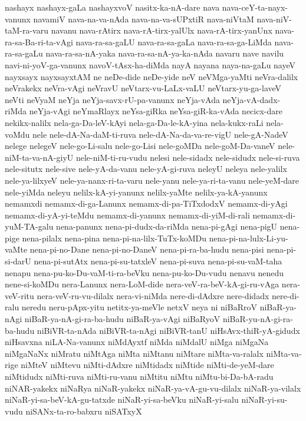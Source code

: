 {nashayx
nashayx-gaLa
nashayxvoV
nasitx-ka-nA-dare
nava
nava-ceY-ta-nayx-vanunx
navamiV
nava-na-va-nAda
nava-na-va-sUPxtiR
nava-niVtaM
nava-niV-taM-ra-varu
navanu
nava-rAtirx
nava-rA-tirx-yalUlx
nava-rA-tirx-yanUnx
nava-ra-sa-Ba-ri-ta-vAgi
nava-ra-sa-gaLU
nava-ra-sa-gaLa
nava-ra-sa-ga-LiMda
nava-ra-sa-gaLu
nava-ra-sa-nA-yaka
nava-ra-sa-nA-ya-ka-nAda
navaru
nave
navilu
navi-ni-yoV-ga-vanunx
navoV-tAsx-ha-diMda
nayA
nayana
naya-na-gaLu
nayeV
nayxsayx
nayxsayxtAM
ne
neDe-dide
neDe-yide
neV
neVMga-yaMti
neVra-dalilx
neVrakekx
neVra-vAgi
neVravU
neVtarx-vu-LaLx-vaLU
neVtarx-yu-ga-laveV
neVti
neVyaM
neYja
neYja-savx-rU-pa-vanunx
neYja-vAda
neYja-vA-dadx-riMda
neYja-vAgi
neYmaRlayx
neYsa-giRka
neYsa-giR-ka-vAda
necicx-dare
nekikx-nalilx
nela-ga-Da-leV-kAyi
nela-ga-Da-le-kA-yina
nela-kukx-raLi
nela-voMdu
nele
nele-dA-Na-daM-ti-ruva
nele-dA-Na-da-va-re-vigU
nele-gA-NadeV
nelege
nelegeV
nele-go-Li-salu
nele-go-Lisi
nele-goMDa
nele-goM-Da-vaneV
nele-niM-ta-va-nA-giyU
nele-niM-ti-ru-vudu
nelesi
nele-sidadx
nele-sidudx
nele-si-ruva
nele-situtx
nele-sive
nele-yA-da-vanu
nele-yA-gi-ruva
neleyU
neleya
nele-yalilx
nele-ya-lilxyeV
nele-ya-nanx-ri-ta-varu
nele-yanu
nele-ya-ri-ta-vanu
nele-yeM-dare
nele-yiMda
neleyu
nelilx-kA-yi-yanunx
nelilx-yaMte
nelilx-ya-kA-yanunx
nemamxdi
nemamx-di-ga-Lanunx
nemamx-di-pa-TiTxdodxV
nemamx-di-yAgi
nemamx-di-yA-yi-teMdu
nemamx-di-yanunx
nemamx-di-yiM-di-rali
nemamx-di-yuM-TA-galu
nena-panunx
nena-pi-dudx-da-riMda
nena-pi-gAgi
nena-pigU
nena-pige
nena-pilalx
nena-pina
nena-pi-na-lilx-TuTx-koMDu
nena-pi-na-lulx-Li-yu-vaMte
nena-pi-no-Dane
nena-pi-no-DaneV
nena-pi-ra-ba-hudu
nena-pisi
nena-pi-si-darU
nena-pi-sutAtx
nena-pi-su-tatxleV
nena-pi-suva
nena-pi-su-vaM-taha
nenapu
nena-pu-ko-Du-vaM-ti-ra-beVku
nena-pu-ko-Du-vudu
nenavu
nenedu
nene-si-koMDu
nera-Lanunx
nera-LoM-dide
nera-veV-ra-beV-kA-gi-ru-vAga
nera-veV-ritu
nera-veV-ru-vu-dilalx
nera-vi-niMda
nere-di-dAdxre
nere-didadx
nere-di-ralu
neredu
neru-pApx-yitu
netitx-ya-meVle
netxV
neya
ni
niBaRroV
niBaR-ya-nAgi
niBaR-ya-nA-gi-ra-ba-hudu
niBaR-ya-vAgi
niBaRyoV
niBaR-yu-nA-gi-ra-ba-hudu
niBiVR-ta-nAda
niBiVR-ta-nAgi
niBiVR-tanU
niHsAvx-thiR-yA-gidudx
niHsavxna
niLA-Na-vanunx
niMdAyxtf
niMda
niMdalU
niMga
niMgaNa
niMgaNaNx
niMratu
niMtAga
niMta
niMtanu
niMtare
niMta-va-ralalx
niMta-va-rige
niMteV
niMtevu
niMti-dAdxre
niMtidadx
niMtide
niMti-de-yeM-dare
niMtidudx
niMti-ruva
niMti-ru-vanu
niMtitu
niMtu
niMtu-bi-Da-bA-radu
niNAR-yakekx
niNaRya
niNaR-yakekx
niNaR-ya-vA-gu-vu-dilalx
niNaR-ya-vilalx
niNaR-yi-sa-beV-kA-gu-tatxde
niNaR-yi-sa-beVku
niNaR-yi-salu
niNaR-yi-su-vudu
niSANx-ta-ro-babxru
niSATxyX
}

